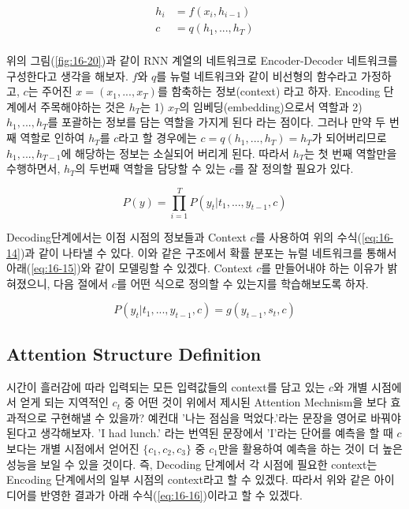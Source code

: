 \documentclass[draft=false]{oblivoir}
\begin{document}
\begin{equation}
	\begin{split}
		h_i & = f(x_i, h_{i-1})\\
		c & = q(h_1, ..., h_T)\\
	\end{split}
	\label{eq:16-13}
\end{equation}

위의 그림(\ref{fig:16-20})과 같이 RNN 계열의 네트워크로 Encoder-Decoder 네트워크를 구성한다고 생각을 해보자. $f$와 $q$를 뉴럴 네트워크와 같이 비선형의 함수라고 가정하고, $c$는 주어진 $x = (x_1, ..., x_T)$를 함축하는 정보(context) 라고 하자. Encoding 단계에서 주목해야하는 것은 $h_T$는 1) $x_T$의 임베딩(embedding)으로서 역할과 2) $h_1, ..., h_T$를 포괄하는 정보를 담는 역할을 가지게 된다 라는 점이다. 그러나 만약 두 번째 역할로 인하여 $h_T$를 $c$라고 할 경우에는 $c = q(h_1, ..., h_T) = h_T$가 되어버리므로 $h_1, ..., h_{T-1}$에 해당하는 정보는 소실되어 버리게 된다. 따라서 $h_T$는 첫 번째 역할만을 수행하면서, $h_T$의 두번째 역할을 담당할 수 있는 $c$를 잘 정의할 필요가 있다.\par

\begin{equation}
	P(y) = \prod_{i=1}^{T}P(y_t|t_1, ..., y_{t-1}, c)
	\label{eq:16-14}
\end{equation}

Decoding단계에서는 이점 시점의 정보들과 Context $c$를 사용하여 위의 수식(\ref{eq:16-14})과 같이 나타낼 수 있다. 이와 같은 구조에서 확률 분포는 뉴럴 네트워크를 통해서 아래(\ref{eq:16-15})와 같이 모델링할 수 있겠다. Context $c$를 만들어내야 하는 이유가 밝혀졌으니, 다음 절에서 $c$를 어떤 식으로 정의할 수 있는지를 학습해보도록 하자. 

\begin{equation}
	P(y_t|t_1, ..., y_{t-1}, c) = g(y_{t-1}, s_t, c)
	\label{eq:16-15}
\end{equation}

\subsection{Attention Structure Definition}
시간이 흘러감에 따라 입력되는 모든 입력값들의 context를 담고 있는 $c$와 개별 시점에서 얻게 되는 지역적인 $c_t$ 중 어떤 것이 위에서 제시된 Attention Mechnism을 보다 효과적으로 구현해낼 수 있을까? 예컨대 '나는 점심을 먹었다.'라는 문장을 영어로 바꿔야 된다고 생각해보자. 'I had lunch.' 라는 번역된 문장에서 'I'라는 단어를 예측을 할 때 $c$보다는 개별 시점에서 얻어진 $\{c_1, c_2, c_3\}$ 중 $c_1$만을 활용하여 예측을 하는 것이 더 높은 성능을 보일 수 있을 것이다.  즉, Decoding 단계에서 각 시점에 필요한 context는 Encoding 단계에서의 일부 시점의 context라고 할 수 있겠다. 따라서 위와 같은 아이디어를 반영한 결과가 아래 수식(\ref{eq:16-16})이라고 할 수 있겠다.
\end{document}
